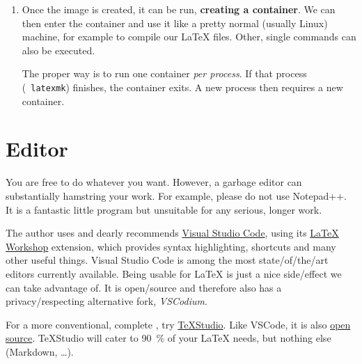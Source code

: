 \begin{enumerate}
        Further, if you for example specify \texttt{FROM python:3.8.6}
        as your base image, aka provided a so\-/called tag of \texttt{3.8.6}, it will be that tag in ten years' time still.
        As such, you nailed the version your process takes place in and requires.
        Once set up, this will run on virtually any computer running Docker, be it your
        laptop now or whatever your machine is in ten years.
        This is especially important for the reproducibility of research.
  \item Once the image is created, it can be run, \textbf{creating a container}.
        We can then enter the container and use it like a pretty normal (usually Linux)
        machine, for example to compile our \LaTeX{} files.
        Other, single commands can also be executed.

        The proper way is to run one container \emph{per process}.
        If that process (\ \texttt{latexmk}) finishes, the container exits.
        A new process then requires a new container.
\end{enumerate}

\section{Editor}
\label{ch:editor}

You are free to do whatever you want.
However, a garbage editor can substantially hamstring your work.
For example, please do not use Notepad++.
It is a fantastic little program but unsuitable for any serious, longer work.

The author uses and dearly recommends \href{https://code.visualstudio.com/}{Visual Studio Code},
using its
\href{https://marketplace.visualstudio.com/items?itemName=James-Yu.latex-workshop}{\LaTeX{} Workshop} extension, which provides syntax highlighting, shortcuts and many other useful things.
Visual Studio Code is among the most state\-/of\-/the\-/art editors currently available.
Being usable for \LaTeX{} is just a nice side\-/effect we can take advantage of.
It is open\-/source and therefore also has a privacy\-/respecting alternative fork, \emph{VSCodium}.

For a more conventional, complete ,
try \href{https://www.texstudio.org/}{TeXStudio}.
Like VSCode, it is also
\href{https://github.com/texstudio-org/texstudio}{open source}.
TeXStudio will cater to \qty{90}{\percent} of your \LaTeX{} needs, but nothing else (Markdown, \dots{}).

